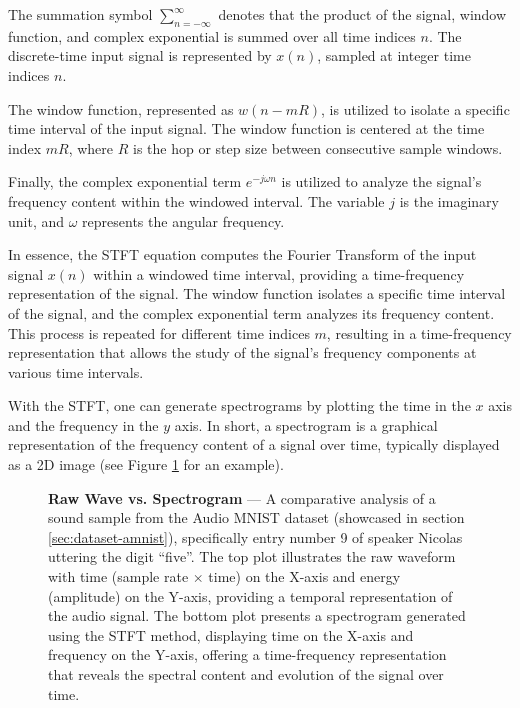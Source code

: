 The summation symbol $\sum_{n=-\infty}^{\infty}$ denotes that the product of the signal, window function, and complex exponential is summed over all time indices $n$. The discrete-time input signal is represented by $x(n)$, sampled at integer time indices $n$.

The window function, represented as $w(n - mR)$, is utilized to isolate a specific time interval of the input signal. The window function is centered at the time index $mR$, where $R$ is the hop or step size between consecutive sample windows.

Finally, the complex exponential term $e^{-j\omega n}$ is utilized to analyze the signal's frequency content within the windowed interval. The variable $j$ is the imaginary unit, and $\omega$ represents the angular frequency.

In essence, the \ac{STFT} equation computes the Fourier Transform of the input signal $x(n)$ within a windowed time interval, providing a time-frequency representation of the signal. The window function isolates a specific time interval of the signal, and the complex exponential term analyzes its frequency content. This process is repeated for different time indices $m$, resulting in a time-frequency representation that allows the study of the signal's frequency components at various time intervals.

With the \ac{STFT}, one can generate spectrograms by plotting the time in the $x$ axis and the frequency in the $y$ axis. In short, a spectrogram is a graphical representation of the frequency content of a signal over time, typically displayed as a 2D image (see Figure \ref{fig:sound} for an example).

\begin{figure}[ht]
    \centering
    \caption[Raw Wave vs. Spectrogram]{\textbf{Raw Wave vs. Spectrogram} --- A comparative analysis of a sound sample from the Audio MNIST dataset (showcased in section \ref{sec:dataset-amnist}), specifically entry number 9 of speaker Nicolas uttering the digit ``five''. The top plot illustrates the raw waveform with time (sample rate $\times$ time) on the X-axis and energy (amplitude) on the Y-axis, providing a temporal representation of the audio signal. The bottom plot presents a spectrogram generated using the \ac{STFT} method, displaying time on the X-axis and frequency on the Y-axis, offering a time-frequency representation that reveals the spectral content and evolution of the signal over time.
    }
    \label{fig:sound}
\end{figure}


